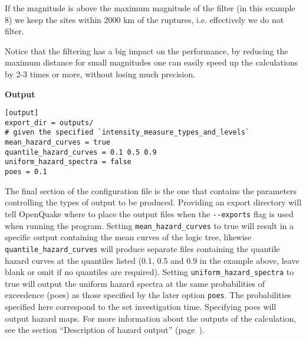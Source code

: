 If the magnitude is above the maximum magnitude of the filter
(in this example 8) we keep the sites within 2000 km of the ruptures, i.e.
effectively we do not filter.

Notice that the filtering has a big impact on the performance, by
reducing the maximum distance for small magnitudes one can easily
speed up the calculations by 2-3 times or more, without losing much
precision.

\textbf{Output}

\begin{verbatim}
[output]
export_dir = outputs/
# given the specified `intensity_measure_types_and_levels`
mean_hazard_curves = true
quantile_hazard_curves = 0.1 0.5 0.9
uniform_hazard_spectra = false
poes = 0.1
\end{verbatim}

The final section of the configuration file is the one that contains the
parameters controlling the types of output to be produced. Providing an export
directory will tell OpenQuake where to place the output files when the
\texttt{-{}-exports} flag is used when running the program. Setting
\verb=mean_hazard_curves= to true will result in a specific output containing
the mean curves of the logic tree, likewise \verb=quantile_hazard_curves= will
produce separate files containing the quantile hazard curves at the quantiles
listed (0.1, 0.5 and 0.9 in the example above, leave blank or omit if no
quantiles are required). Setting \verb=uniform_hazard_spectra= to true will
output the uniform hazard spectra at the same probabilities of exceedence
(poes) as those specified by the later option \verb=poes=. The probabilities
specified here correspond to the set investigation time. Specifying poes 
will output hazard maps. For more information about the outputs of the
calculation, see the section 
``Description of hazard output'' (page~\pageref{sec:hazard_outputs}).